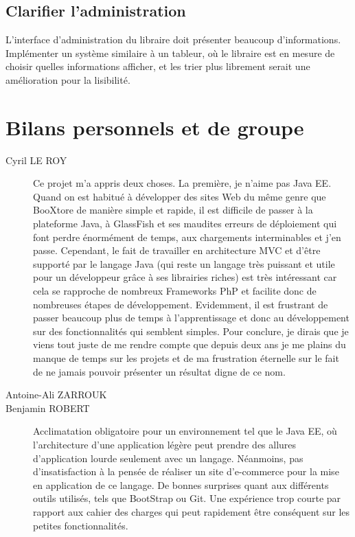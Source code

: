 	\subsection{Clarifier l'administration}

	L'interface d'administration du libraire doit présenter beaucoup d'informations. Implémenter un système similaire à un tableur, où le libraire est en mesure de choisir quelles informations afficher, et les trier plus librement serait une amélioration pour la lisibilité.


\section{Bilans personnels et de groupe}

\begin{description}
	\item[Cyril LE ROY]
	Ce projet m’a appris deux choses.
	La première, je n’aime pas Java EE. Quand on est habitué à développer des sites Web du même genre que BooXtore de manière simple et rapide, il est difficile de passer à la plateforme Java, à GlassFish et ses maudites erreurs de déploiement qui font perdre énormément de temps, aux chargements interminables et j’en passe.
	Cependant, le fait de travailler en architecture MVC et d’être supporté par le langage Java (qui reste un langage très puissant et utile pour un développeur grâce à ses librairies riches) est très intéressant car cela se rapproche de nombreux Frameworks PhP et facilite donc de nombreuses étapes de développement.
	Evidemment, il est frustrant de passer beaucoup plus de temps à l’apprentissage et donc au développement sur des fonctionnalités qui semblent simples.
	Pour conclure, je dirais que je viens tout juste de me rendre compte que depuis deux ans je me plains du manque de temps sur les projets et de ma frustration éternelle sur le fait de ne jamais pouvoir présenter un résultat digne de ce nom.
	\item[Antoine-Ali ZARROUK]
	\item[Benjamin ROBERT]
	Acclimatation obligatoire pour un environnement tel que le Java EE, où l'architecture d'une application légère peut prendre des allures d'application lourde seulement avec un langage.
	Néanmoins, pas d'insatisfaction à la pensée de réaliser un site d'e-commerce pour la mise en application de ce langage. De bonnes surprises quant aux différents outils utilisés, tels que BootStrap ou Git. Une expérience trop courte par rapport aux cahier des charges qui peut rapidement être conséquent sur les petites fonctionnalités.

\end{description}
